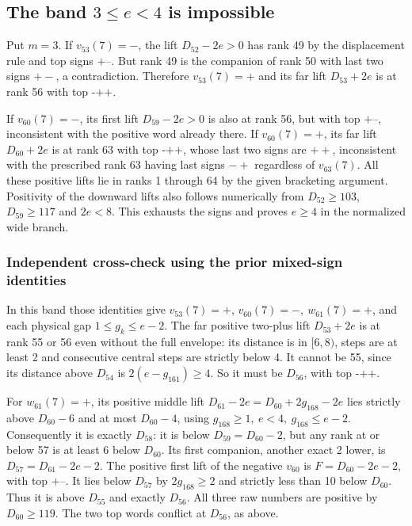 \documentclass[
  11pt,
]{article}
\begin{document}
\subsection{\texorpdfstring{The band \(3\le e<4\) is
impossible}{The band 3\textbackslash le e\textless4 is impossible}}\label{the-band-3le-e4-is-impossible}

Put \(m=3\). If \(v_{53}(7)=-\), the lift \(D_{52}-2e>0\) has rank 49 by
the displacement rule and top signs \(\texttt{+--}\). But rank 49 is the
companion of rank 50 with last two signs \(+-\), a contradiction.
Therefore \(v_{53}(7)=+\) and its far lift \(D_{53}+2e\) is at rank 56
with top \(\texttt{-++}\).

If \(v_{60}(7)=-\), its first lift \(D_{59}-2e>0\) is also at rank 56,
but with top \(\texttt{+--}\), inconsistent with the positive word
already there. If \(v_{60}(7)=+\), its far lift \(D_{60}+2e\) is at rank
63 with top \(\texttt{-++}\), whose last two signs are \(++\),
inconsistent with the prescribed rank 63 having last signs \(-+\)
regardless of \(v_{63}(7)\). All these positive lifts lie in ranks 1
through 64 by the given bracketing argument. Positivity of the downward
lifts also follows numerically from \(D_{52}\ge103\), \(D_{59}\ge117\)
and \(2e<8\). This exhausts the signs and proves \(e\ge4\) in the
normalized wide branch.

\subsubsection{Independent cross-check using the prior mixed-sign
identities}\label{independent-cross-check-using-the-prior-mixed-sign-identities}

In this band those identities give \(v_{53}(7)=+\),
\(v_{60}(7)=-,\ w_{61}(7)=+\), and each physical gap
\(1\le g_k\le e-2\). The far positive two-plus lift \(D_{53}+2e\) is at
rank 55 or 56 even without the full envelope: its distance is in
\([6,8)\), steps are at least 2 and consecutive central steps are
strictly below 4. It cannot be 55, since its distance above \(D_{54}\)
is \(2(e-g_{161})\ge4\). So it must be \(D_{56}\), with top
\(\texttt{-++}\).

For \(w_{61}(7)=+\), its positive middle lift
\(D_{61}-2e=D_{60}+2g_{168}-2e\) lies strictly above \(D_{60}-6\) and at
most \(D_{60}-4\), using \(g_{168}\ge1,\ e<4,\ g_{168}\le e-2\).
Consequently it is exactly \(D_{58}\): it is below \(D_{59}=D_{60}-2\),
but any rank at or below 57 is at least 6 below \(D_{60}\). Its first
companion, another exact 2 lower, is \(D_{57}=D_{61}-2e-2\). The
positive first lift of the negative \(v_{60}\) is \(F=D_{60}-2e-2\),
with top \(\texttt{+--}\). It lies below \(D_{57}\) by \(2g_{168}\ge2\)
and strictly less than 10 below \(D_{60}\). Thus it is above \(D_{55}\)
and exactly \(D_{56}\). All three raw numbers are positive by
\(D_{60}\ge119\). The two top words conflict at \(D_{56}\), as above.
\end{document}

